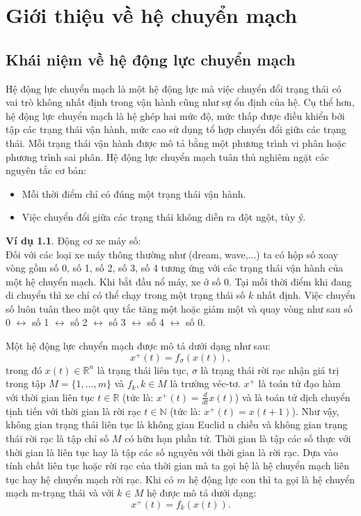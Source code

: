 \documentclass[14pt,a4paper,oneside]{report}		%
\theoremstyle{definition}
\newtheorem{example}[theorem]{Ví dụ}
\begin{document}
\chapter{Giới thiệu về hệ chuyển mạch}
\section{Khái niệm về hệ động lực chuyển mạch}
Hệ động lực chuyển mạch là một hệ động lực mà việc chuyển đổi trạng thái có vai trò không nhất định trong vận hành cũng như sự ổn định của hệ. Cụ thể hơn, hệ động lực chuyển mạch là hệ ghép hai mức độ, mức thấp được điều khiển bởi tập các trạng thái vận hành, mức cao sử dụng tổ hợp chuyển đổi giữa các trạng thái. Mỗi trạng thái vận hành được mô tả bằng một phương trình vi phân hoặc phương trình sai phân. Hệ động lực chuyển mạch tuân thủ nghiêm ngặt các nguyên tắc cơ bản:
\begin{itemize}
  \item Mỗi thời điểm chỉ có đúng một trạng thái vận hành.
  \item Việc chuyển đổi giữa các trạng thái không diễn ra đột ngột, tùy ý.
\end{itemize}
\begin{example}
Động cơ xe máy số:\\
Đối với các loại xe máy thông thường như (dream, wave,...) ta có hộp số xoay vòng gồm số 0, số 1, số 2, số 3, số 4 tương ứng với các trạng thái vận hành của một hệ chuyển mạch. Khi bắt đầu nổ máy, xe ở số 0. Tại mỗi thời điểm khi đang di chuyển thì xe chỉ có thể chạy trong một trạng thái số $k$ nhất định. Việc chuyển số luôn tuân theo một quy tắc tăng một hoặc giảm một và quay vòng như sau số 0 $\leftrightarrow$ số 1 $\leftrightarrow$ số 2 $\leftrightarrow$ số 3 $\leftrightarrow$ số 4 $\leftrightarrow$ số 0.
\end{example}

Một hệ động lực chuyển mạch được mô tả dưới dạng như sau:
\begin{equation} \label{eq1-1}
x^+(t) = f_\sigma(x(t)),
\end{equation}
trong đó $x(t)\in\mathbb{R}^n$ là trạng thái liên tục, $\sigma$ là trạng thái rời rạc nhận giá trị trong tập $M = \{1,...,m\}$ và $f_k, k\in M$ là trường véc-tơ. $x^+$ là toán tử đạo hàm với thời gian liên tục $t\in\mathbb{R}$ (tức là: $x^+(t)=\frac{d}{dt}x(t)$) và là toán tử dịch chuyển tịnh tiến với thời gian là rời rạc $t\in\mathbb{N}$ (tức là: $x^+(t)=x(t+1)$). Như vậy, không gian trạng thái liên tục là không gian Euclid n chiều và không gian trạng thái rời rạc là tập chỉ số $M$ có hữu hạn phần tử. Thời gian là tập các số thực với thời gian là liên tục hay là tập các số nguyên với thời gian là rời rạc. Dựa vào tính chất liên tục hoặc rời rạc của thời gian mà ta gọi hệ là hệ chuyển mạch liên tục hay hệ chuyển mạch rời rạc. Khi có $m$ hệ động lực con thì ta gọi là hệ chuyển mạch m-trạng thái và với $k\in M$ hệ được mô tả dưới dạng:
\begin{equation} \label{eq1-2}
x^+(t) = f_k(x(t)).
\end{equation}
\end{document}
